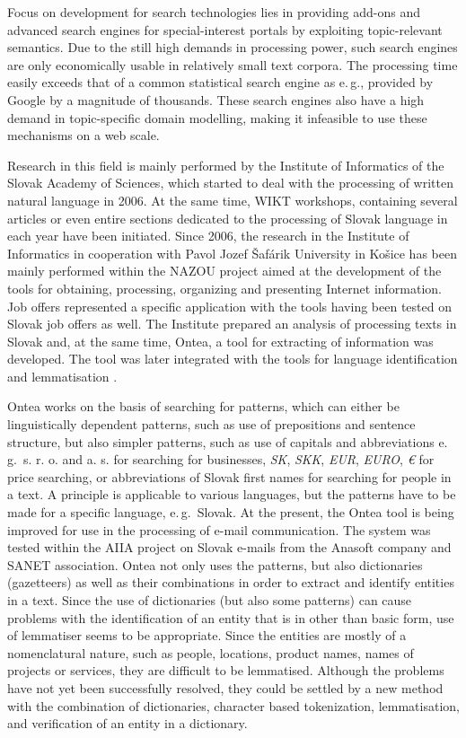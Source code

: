 \begin{multicols}{2}
Focus on development for search technologies lies in providing add-ons and advanced search engines for special-interest portals by exploiting topic-relevant semantics. Due to the still high demands in processing power, such search engines are only economically usable in relatively small text corpora. The processing time easily exceeds that of a common statistical search engine as e.\,g., provided by Google by a magnitude of thousands. These search engines also have a high demand in topic-specific domain modelling, making it infeasible to use these mechanisms on a web scale.

Research in this field is mainly performed by the Institute of Informatics of the Slovak Academy of Sciences, which started to deal with the processing of written natural language in 2006. At the same time, WIKT\cite{f26} workshops, containing several articles or even entire sections dedicated to the processing of Slovak language in each year have been initiated. Since 2006, the research in the Institute of Informatics in cooperation with Pavol Jozef Šafárik University in Košice has been mainly performed within the NAZOU\cite{f27} project aimed at the development of the tools for obtaining, processing, organizing and presenting Internet information. Job offers represented a specific application with the tools having been tested on Slovak job offers as well.  The Institute prepared an analysis of processing texts in Slovak \cite{laclavik2007a} and, at the same time, Ontea\cite{f28}, a tool for extracting of information \cite{laclavik2007b,laclavik2009} was developed. The tool was later integrated with the tools for language identification \cite{vojtek2006} and lemmatisation \cite{krajci2007}.

Ontea works on the basis of searching for patterns, which can either be linguistically dependent patterns, such as use of prepositions and sentence structure, but also simpler patterns, such as use of capitals and abbreviations e.\,g.~s. r. o. and a. s. for searching for businesses, \emph{SK}, \emph{SKK}, \emph{EUR}, \emph{EURO}, \emph{€} for price searching, or abbreviations of Slovak first names for searching for people in a text. A principle is applicable to various languages, but the patterns have to be made for a specific language, e.\,g.~Slovak.  At the present, the Ontea tool is being improved for use in the processing of e-mail communication. The system was tested within the AIIA project\cite{f29} \cite{laclavik2010} on Slovak e-mails from the Anasoft company and SANET association. Ontea not only uses the patterns, but also dictionaries (gazetteers) as well as their combinations in order to extract and identify entities in a text. Since the use of dictionaries (but also some patterns) can cause problems with the identification of an entity that is in other than basic form, use of lemmatiser seems to be appropriate. Since the entities are mostly of a nomenclatural nature, such as people, locations, product names, names of projects or services, they are difficult to be lemmatised. Although the problems have not yet been successfully resolved, they could be settled by a new method with the combination of dictionaries, character based tokenization, lemmatisation, and verification of an entity in a dictionary.


\end{multicols}
